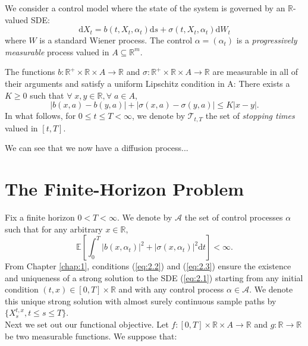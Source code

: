 \begin{definition}
    We consider a control model where the state of the system is governed by 
    an $\mathbb{R}$-valued SDE:
    \begin{equation}\label{eq:2.1}
        \mathrm dX_t=b(t,X_t,\alpha_t)\mathrm ds+\sigma(t,X_t,\alpha_t)\mathrm dW_t
    \end{equation}
    where $W$ is a standard Wiener process. The control $\alpha=(\alpha_t)$ is a 
    \emph{progressively measurable} process valued in $A\subseteq\mathbb{R}^m$.
\end{definition}

The functions $b:\mathbb{R}^+\times\mathbb{R}\times A\rightarrow\mathbb{R}$
and $\sigma:\mathbb{R}^+\times\mathbb{R}\times A\rightarrow\mathbb{R}$ are measurable
in all of their arguments and satisfy a uniform Lipschitz condition in A:
There exists a $K\geq0$ such that $\forall\;x,y\in\mathbb{R}, \forall\;a\in A,$
\begin{equation}\label{eq:2.2}
    |b(x,a)-b(y,a)|+|\sigma(x,a)-\sigma(y,a)|\leq K|x-y|.
\end{equation}
In what follows, for $0\leq t\leq T<\infty$, we denote by $\mathcal{T}_{t,T}$ the
set of \emph{stopping times} valued in $[t,T]$.

We can see that we now have a diffusion process...

\section{The Finite-Horizon Problem}\label{sec:2.3}

Fix a finite horizon $0<T<\infty$. We denote by $\mathcal{A}$ the set of control
processes $\alpha$ such that for any arbitrary $x\in\mathbb{R},$
\begin{equation}\label{eq:2.3}
    \mathbb{E}\left[\int_0^T|b(x,\alpha_t)|^2+|\sigma(x,\alpha_t)|^2\mathrm dt\right]<\infty.
\end{equation}
From Chapter \ref{chap:1}, conditions (\ref{eq:2.2}) and (\ref{eq:2.3}) ensure the existence
and uniqueness of a strong solution to the SDE (\ref{eq:2.1}) starting from any initial
condition $(t,x)\in[0,T]\times\mathbb{R}$ and with any control process $\alpha\in\mathcal{A}$.
We denote this unique strong solution with almost surely continuous sample paths by 
$\{X_s^{t,x},t\leq s\leq T\}$.\\
Next we set out our functional objective. Let $f:[0,T]\times\mathbb{R}\times A\rightarrow\mathbb{R}$
and $g:\mathbb{R}\rightarrow\mathbb{R}$ be two measurable functions. We suppose that:

